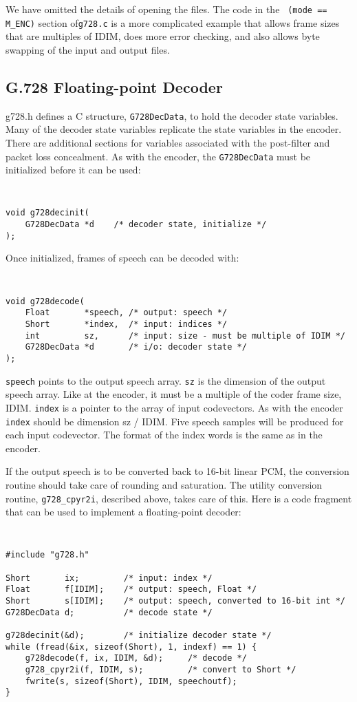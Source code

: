 We have omitted the details of opening the files. The code in the {\tt
(mode == M\_ENC)} section of{\tt g728.c} is a more complicated
example that allows frame sizes that are multiples of IDIM, does more
error checking, and also allows byte swapping of the input and output
files.

\subsection {G.728 Floating-point Decoder}

g728.h defines a C structure, {\tt G728DecData}, to hold the decoder
state variables. Many of the decoder state variables replicate
the state variables in the encoder. There are additional
sections for variables associated with the post-filter and
packet loss concealment. As with the encoder, the {\tt G728DecData}
must be initialized before it can be used:

{\tt\small
\begin{verbatim}
void g728decinit(
    G728DecData *d    /* decoder state, initialize */
);
\end{verbatim}
}

Once initialized, frames of speech can be decoded with:

{\tt\small
\begin{verbatim}
void g728decode(
    Float       *speech, /* output: speech */
    Short       *index,  /* input: indices */
    int         sz,      /* input: size - must be multiple of IDIM */
    G728DecData *d       /* i/o: decoder state */	
);
\end{verbatim}
}

{\tt speech} points to the output speech array.  {\tt sz} is the
dimension of the output speech array.  Like at the encoder, it must be a
multiple of the coder frame size, IDIM.  {\tt index} is a pointer to
the array of input codevectors.  As with the encoder {\tt index}
should be dimension sz / IDIM.  Five speech samples will be produced
for each input codevector. The format of the index words is the same
as in the encoder.

If the output speech is to be converted back to 16-bit linear PCM, the
conversion routine should take care of rounding and saturation.
The utility conversion routine, {\tt g728\_cpyr2i}, described above,
takes care of this. Here is a code fragment that can be used
to implement a floating-point decoder:

{\tt\small
\begin{verbatim}
#include "g728.h"

Short       ix;         /* input: index */
Float       f[IDIM];    /* output: speech, Float */
Short       s[IDIM];    /* output: speech, converted to 16-bit int */
G728DecData d;          /* decode state */

g728decinit(&d);        /* initialize decoder state */
while (fread(&ix, sizeof(Short), 1, indexf) == 1) {
    g728decode(f, ix, IDIM, &d);     /* decode */
    g728_cpyr2i(f, IDIM, s);         /* convert to Short */
    fwrite(s, sizeof(Short), IDIM, speechoutf);
}
\end{verbatim}
}

